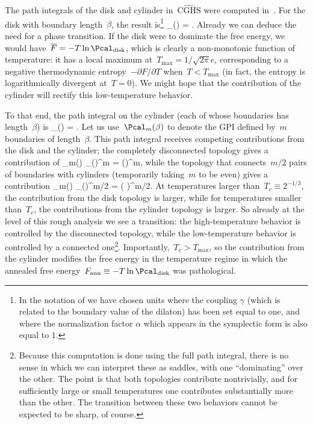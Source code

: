 \documentclass[12pt]{article}
\newcommand{\adm}[1]{\textcolor{purple}{(#1)}}
\begin{document}
The path integrals of the disk and cylinder in~$\widehat{\mathrm{CGHS}}$ were computed in~\cite{GodMar20}.  
For the disk with boundary length~$\beta$, the result is\footnote{In the notation of \cite{GodMar20} we have chosen units where the coupling $\gamma$ (which is related to the boundary value of the dilaton) has been set equal to one, and where the normalization factor $\alpha$ which appears in the symplectic form is also equal to $1$.}
\be
\Pcal_(\beta) = .
\ee
Already we can deduce the need for a phase transition.  If the disk were to dominate the free energy, we would have~$\overline{F} = -T \ln \Pcal_\mathrm{disk}$, which is clearly a non-monotonic function of temperature: it has a local maximum at~$T_\mathrm{max} = 1/\sqrt{2\pi} e$, corresponding to a negative thermodynamic entropy~$-\partial F/\partial T$ when~$T < T_\mathrm{max}$ (in fact, the entropy is logarithmically divergent at~$T = 0$).  We might hope that the contribution of the cylinder will rectify this low-temperature behavior.

To that end, the path integral on the cylinder (each of whose boundaries has length~$\beta$) is
\be
\Pcal_(\beta) = .
\ee
Let us use~$\Pcal_m(\beta)$ to denote the GPI defined by~$m$ boundaries of length~$\beta$.  This path integral receives competing contributions from the disk and the cylinder; the completely disconnected topology gives a contribution of
\be
\Pcal_m(\beta) \supset \Pcal_(\beta)^m = \left(\right)^m,
\ee
while the topology that connects~$m/2$ pairs of boundaries with cylinders (temporarily taking~$m$ to be even) gives a contribution
\be
\Pcal_m(\beta) \supset \Pcal_(\beta)^{m/2} = \left( \right)^{m/2}.
\ee
At temperatures larger than~$T_c \equiv 2^{-1/3}$, the contribution from the disk topology is larger, while for temperatures smaller than~$T_c$, the contributions from the cylinder topology is larger.  So already at the level of this rough analysis we see a transition: the high-temperature behavior is controlled by the disconnected topology, while the low-temperature behavior is controlled by a connected one\footnote{Because this computation is done using the full path integral, there is no sense in which we can interpret these as saddles, with one ``dominating'' over the other.  The point is that both topologies contribute nontrivially, and for sufficiently large or small temperatures one contributes substantially more than the other.  The transition between these two behaviors cannot be expected to be sharp, of course.}.  Importantly,~$T_c > T_\mathrm{max}$, so the contribution from the cylinder modifies the free energy in the temperature regime in which the annealed free energy~$F_\mathrm{ann} \equiv -T\ln \Pcal_\mathrm{disk}$ was pathological.
\end{document}
